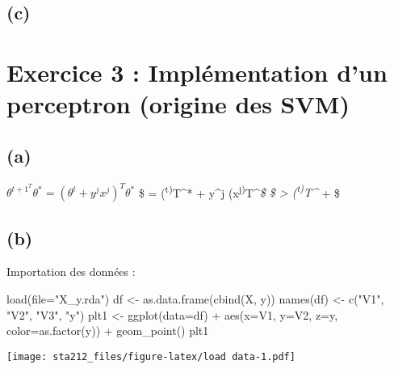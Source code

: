 \documentclass[
]{article}
\newenvironment{Shaded}{\begin{snugshade}}{\end{snugshade}}
\newcommand{\AttributeTok}[1]{\textcolor[rgb]{0.77,0.63,0.00}{#1}}
\newcommand{\FunctionTok}[1]{\textcolor[rgb]{0.00,0.00,0.00}{#1}}
\newcommand{\NormalTok}[1]{#1}
\newcommand{\OtherTok}[1]{\textcolor[rgb]{0.56,0.35,0.01}{#1}}
\newcommand{\SpecialCharTok}[1]{\textcolor[rgb]{0.00,0.00,0.00}{#1}}
\newcommand{\StringTok}[1]{\textcolor[rgb]{0.31,0.60,0.02}{#1}}
\begin{document}
\hypertarget{c}{%
\subsection{(c)}\label{c}}

\hypertarget{exercice-3-impluxe9mentation-dun-perceptron-origine-des-svm}{%
\section{Exercice 3 : Implémentation d'un perceptron (origine des
SVM)}\label{exercice-3-impluxe9mentation-dun-perceptron-origine-des-svm}}

\hypertarget{a-2}{%
\subsection{(a)}\label{a-2}}

\(\theta^{t+1}^T \theta^* = (\theta^t + y^j x^j)^T \theta^*\) \$ =
(\theta\textsuperscript{t)}T\theta\^{}* + y\^{}j
(x\textsuperscript{j)}T\theta\^{}\emph{\$ \$ \textgreater{}
(\theta\textsuperscript{t)}T\theta\^{}} + \$

\hypertarget{b-2}{%
\subsection{(b)}\label{b-2}}

Importation des données :

\begin{Shaded}
\begin{Highlighting}[]
\FunctionTok{load}\NormalTok{(}\AttributeTok{file=}\StringTok{"X\_y.rda"}\NormalTok{)}
\NormalTok{df }\OtherTok{\textless{}{-}} \FunctionTok{as.data.frame}\NormalTok{(}\FunctionTok{cbind}\NormalTok{(X, y))}
\FunctionTok{names}\NormalTok{(df) }\OtherTok{\textless{}{-}} \FunctionTok{c}\NormalTok{(}\StringTok{"V1"}\NormalTok{, }\StringTok{"V2"}\NormalTok{, }\StringTok{"V3"}\NormalTok{, }\StringTok{"y"}\NormalTok{)}
\NormalTok{plt1 }\OtherTok{\textless{}{-}} \FunctionTok{ggplot}\NormalTok{(}\AttributeTok{data=}\NormalTok{df) }\SpecialCharTok{+} \FunctionTok{aes}\NormalTok{(}\AttributeTok{x=}\NormalTok{V1, }\AttributeTok{y=}\NormalTok{V2, }\AttributeTok{z=}\NormalTok{y, }\AttributeTok{color=}\FunctionTok{as.factor}\NormalTok{(y)) }\SpecialCharTok{+} \FunctionTok{geom\_point}\NormalTok{()}
\NormalTok{plt1}
\end{Highlighting}
\end{Shaded}

\texttt{[image: sta212\_files/figure-latex/load data-1.pdf]}
\end{document}
